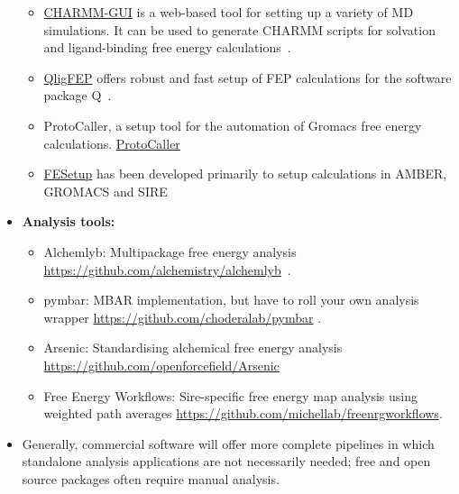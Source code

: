 \documentclass[9pt,bestpractices]{livecoms}
\begin{document}
\begin{itemize}
\begin{itemize}
	\item \href{http://www.charmm-gui.org/}{CHARMM-GUI} is a web-based tool for setting up a variety of MD simulations. It can be used to generate CHARMM scripts for solvation and ligand-binding free energy calculations~\cite{jo2008charmmgui}.
	\item \href{https://github.com/qusers/qligfep}{QligFEP} offers robust and fast setup of FEP calculations for the software package Q~\cite{jespers2019qligfep}.
	\item ProtoCaller, a setup tool for the automation of Gromacs free energy calculations. \href{https://github.com/protocaller/ProtoCaller}{ProtoCaller}~\cite{suruzhon2020protocaller}
	\item \href{https://fesetup.readthedocs.io/en/latest/introduction.html}{FESetup} has been developed primarily to setup calculations in AMBER, GROMACS and SIRE~\cite{loeffler2015fesetup}
	\end{itemize}
\item []\textbf{Analysis tools:}
	\begin{itemize}

	\item Alchemlyb: Multipackage free energy analysis
	\url{https://github.com/alchemistry/alchemlyb}~\cite{daviddotson2020alchemistry}.
	\item pymbar: MBAR implementation, but have to roll your own analysis wrapper      
	\url{https://github.com/choderalab/pymbar} \cite{shirts2008statisticallya}.
	\item Arsenic: Standardising alchemical free energy analysis \url{https://github.com/openforcefield/Arsenic}
	\item Free Energy Workflows: Sire-specific free energy map analysis using weighted path averages \url{https://github.com/michellab/freenrgworkflows}.
	\end{itemize}
\item[] Generally, commercial software will offer more complete pipelines in which standalone analysis applications are not necessarily needed; free and open source packages often require manual analysis.
\end{itemize}


\end{document}
